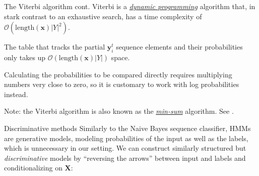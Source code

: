 \documentclass[style=upen, size=14pt]{powerdot}
\theoremstyle{definition}
\begin{document}
  \begin{slide}[toc=]{The Viterbi algorithm cont.}
    Viterbi is a \emph{\href{https://en.wikipedia.org/wiki/Dynamic_programming}{dynamic programming}} algorithm that, in stark contrast
    to an exhaustive search, has a time complexity of
    $\mathcal O(\mathrm{length}(\mathbf{x})|Y|^2)$.\medskip

    The table that tracks the partial $\mathbf{y}_i^t$ sequence elements and
    their probabilities only takes up
    $\mathcal{O}(\mathrm{length}(\mathbf{x})|Y|)$ space.\medskip


    Calculating the probabilities to be compared directly requires multiplying
    numbers very close to zero, so it is customary to work with log
    probabilities instead.\medskip %

    \begin{small}
      Note: the Viterbi algorithm is also known as the \emph{\href{http://www.inference.org.uk/itprnn/book.pdf}{min-sum}} algorithm. See \citet[p. 245]{mackay2003information}.
    \end{small}
  \end{slide}

  \begin{slide}[toc=Discriminative methods]{Discriminative methods}
    Similarly to the Naive Bayes sequence classifier, HMMs are generative
    models, modeling probabilities of the input as well as the labels, which is
    unnecessary in our setting. We can construct similarly structured but
    \emph{discriminative} models by ``reversing the arrows'' between input and
    labels and conditionalizing on $\mathbf{X}$:

    
    \begin{center}
    \end{center}
  \end{slide}
\end{document}
